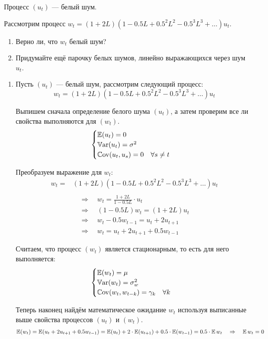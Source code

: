 \begin{problem}
  Процесс $(u_t)$ — белый шум.

  Рассмотрим процесс $w_t = (1+2L)(1-0.5L + 0.5^2 L^2 - 0.5^3 L^3 + \ldots )u_t$.

  \begin{enumerate}
    \item Верно ли, что $w_t$ белый шум?
    \item Придумайте ещё парочку белых шумов, линейно выражающихся через шум $u_t$.
  \end{enumerate}

  \begin{sol}
\begin{enumerate}
  \item 
Пусть $(u_t)$ — белый шум, рассмотрим следующий процесс:
\[
    w_t = (1 + 2L) (1 - 0.5L + 0.5^2 L^2 - 0.5^3 L^3+ \ldots)u_t
\]

Выпишем сначала определение белого шума $(u_t)$, а затем проверим все ли свойства выполняются для $(w_t)$.
\[
    \begin{cases}
       \operatorname{\mathbb{E}}(u_t) = 0 \\
        \operatorname{\mathbb{V}\mathrm{ar}}(u_t) = \sigma^2 \\
        \operatorname{\mathbb{C}\mathrm{ov}}(u_t, u_s) = 0 \quad \forall s \neq t
    \end{cases}
    \]

Преобразуем выражение для $w_t$:
\begin{align*}
    w_t =& (1 + 2L) (1 - 0.5L + 0.5^2 L^2 - 0.5^3 L^3+ \ldots)u_t \\ \\
    &\quad \Rightarrow \quad w_t = \frac{1 + 2L}{1 - 0.5L}\cdot u_t \\
    &\quad \Rightarrow \quad (1 - 0.5L)w_t = (1 + 2L) u_t \\
    &\quad \Rightarrow \quad w_t - 0.5w_{t-1} = u_t + 2u_{t+1} \\
    &\quad \Rightarrow \quad w_t = u_t + 2u_{t+1} + 0.5w_{t-1}
\end{align*}

Считаем, что процесс $(w_t)$ является стационарным, то есть для него выполняется:
\[
    \begin{cases}
        \operatorname{\mathbb{E}}(w_t) = \mu \\
        \operatorname{\mathbb{V}\mathrm{ar}}(w_t) = \sigma_w^2 \\
        \operatorname{\mathbb{C}\mathrm{ov}}(w_t, w_{t-k}) = \gamma_k \quad \forall k
    \end{cases}
\]

Теперь наконец найдём математическое ожидание $w_t$ используя выписанные выше свойства процессов $(u_t)$ и $(w_t)$.
\begin{gather*}
    \operatorname{\mathbb{E}}(w_t) = \operatorname{\mathbb{E}}(u_t + 2u_{t+1} + 0.5w_{t-1}) = \operatorname{\mathbb{E}}(u_t) + 2\cdot \operatorname{\mathbb{E}}(u_{t+1}) + 0.5\cdot \operatorname{\mathbb{E}}(w_{t-1}) = 0.5\cdot \operatorname{\mathbb{E}}{w_t} \quad \Rightarrow \quad \operatorname{\mathbb{E}}{w_t} = 0
\end{gather*}


\end{enumerate}
\end{sol}
\end{problem}
